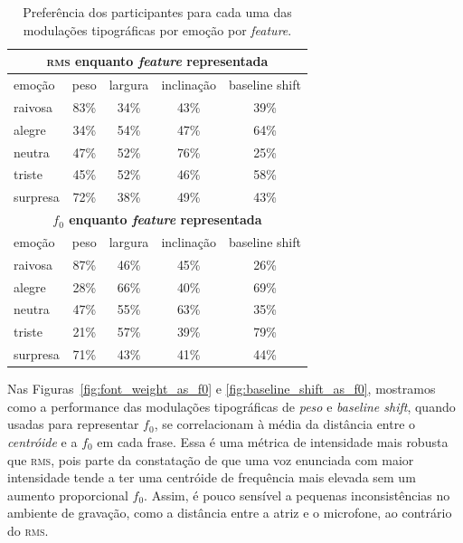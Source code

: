 \documentclass[11pt]{article}
\begin{document}
\begin{table}
    \begin{tabular*}{\linewidth}{lcccc}
        \toprule
        \multicolumn{5}{c}{ \textbf{\textsc{rms} enquanto {\itshape feature} representada} }     \\
        \midrule
        emoção & peso & largura & inclinação & baseline shift  \\
        \midrule
        raivosa       & 83\% & 34\% & 43\% & 39\% \\
        alegre        & 34\% & 54\% & 47\% & 64\% \\
        neutra        & 47\% & 52\% & \cellcolor[HTML]{9ef7cd}76\% & 25\% \\
        triste        & 45\% & 52\% & 46\% & 58\% \\
        surpresa      & \cellcolor[HTML]{9ef7cd}72\% & 38\% & 49\% & 43\% \\
        \midrule
        \multicolumn{5}{c}{ \textbf{$f_0$ enquanto {\itshape feature} representada} }      \\
        \midrule
        emoção & peso & largura & inclinação & baseline shift  \\
        \midrule
        raivosa       & \cellcolor[HTML]{9ef7cd}87\% & 46\% & 45\% & 26\% \\
        alegre        & 28\% & 66\% & 40\% & \cellcolor[HTML]{9ef7cd}69\% \\
        neutra        & 47\% & 55\% & 63\% & 35\% \\
        triste        & 21\% & 57\% & 39\% & \cellcolor[HTML]{9ef7cd}79\% \\
        surpresa      & 71\% & 43\% & 41\% & 44\% \\
        \bottomrule
    \end{tabular*}
    \caption{Preferência dos participantes para cada uma das modulações tipográficas por emoção por {\itshape feature}. }
    \label{tab:type_perf}
\end{table}
  
  Nas Figuras~\ref{fig:font_weight_as_f0} e \ref{fig:baseline_shift_as_f0}, mostramos como a performance das modulações tipográficas de {\itshape peso} e {\itshape baseline shift}, quando usadas para representar $f_0$, se correlacionam à média da distância entre o {\itshape centróide} e a $f_0$ em cada frase. Essa é uma métrica de intensidade mais robusta que \textsc{rms}, pois parte da constatação de que uma voz enunciada com maior intensidade tende a ter uma centróide de frequência mais elevada sem um aumento proporcional $f_0$. Assim, é pouco sensível a pequenas inconsistências no ambiente de gravação, como a distância entre a atriz e o microfone, ao contrário do \textsc{rms}.
  
\end{document}
